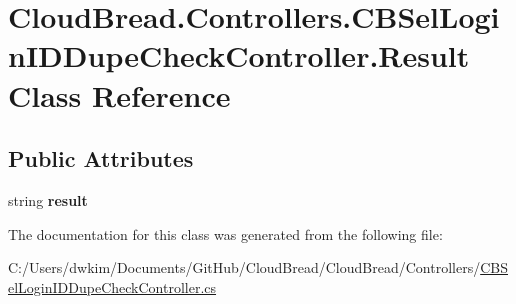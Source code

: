 \hypertarget{a00174}{}\section{Cloud\+Bread.\+Controllers.\+C\+B\+Sel\+Login\+I\+D\+Dupe\+Check\+Controller.\+Result Class Reference}
\label{a00174}
\subsection*{Public Attributes}
\begin{DoxyCompactItemize}
\item 
string {\bfseries result}\hypertarget{a00174_aaa91f7ba629b20ebac3f83a65430b673}{}\label{a00174_aaa91f7ba629b20ebac3f83a65430b673}

\end{DoxyCompactItemize}


The documentation for this class was generated from the following file\+:\begin{DoxyCompactItemize}
\item 
C\+:/\+Users/dwkim/\+Documents/\+Git\+Hub/\+Cloud\+Bread/\+Cloud\+Bread/\+Controllers/\hyperlink{a00221}{C\+B\+Sel\+Login\+I\+D\+Dupe\+Check\+Controller.\+cs}\end{DoxyCompactItemize}

